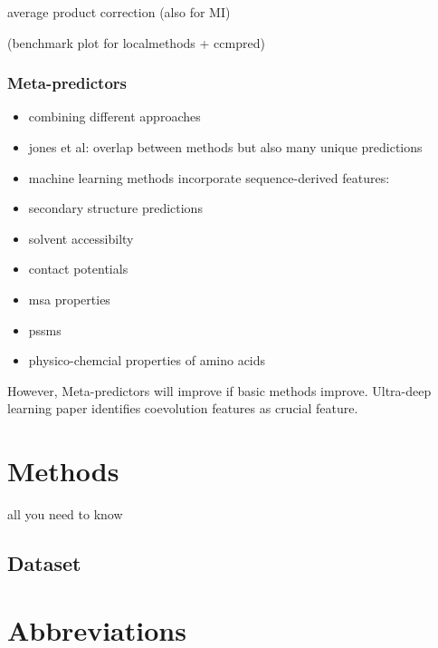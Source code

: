 \documentclass[12pt,a4paper,twoside]{book}
\providecommand{\tightlist}{%
  \setlength{\itemsep}{0pt}\setlength{\parskip}{0pt}}
\theoremstyle{definition}
\theoremstyle{definition}
\theoremstyle{remark}
\begin{document}
average product correction (also for MI)

(benchmark plot for localmethods + ccmpred)

\subsection{Meta-predictors}\label{meta-predictors}

\begin{itemize}
\tightlist
\item
  combining different approaches
\item
  jones et al: overlap between methods but also many unique predictions
\item
  machine learning methods incorporate sequence-derived features:
\item
  secondary structure predictions
\item
  solvent accessibilty
\item
  contact potentials
\item
  msa properties
\item
  pssms
\item
  physico-chemcial properties of amino acids
\end{itemize}

However, Meta-predictors will improve if basic methods improve.
Ultra-deep learning paper identifies coevolution features as crucial
feature.

\chapter{Methods}\label{methods}

all you need to know

\section{Dataset}\label{dataset}

\appendix


\chapter{Abbreviations}\label{abbreviations}

\begin{acronym}
\end{acronym}
\end{document}
